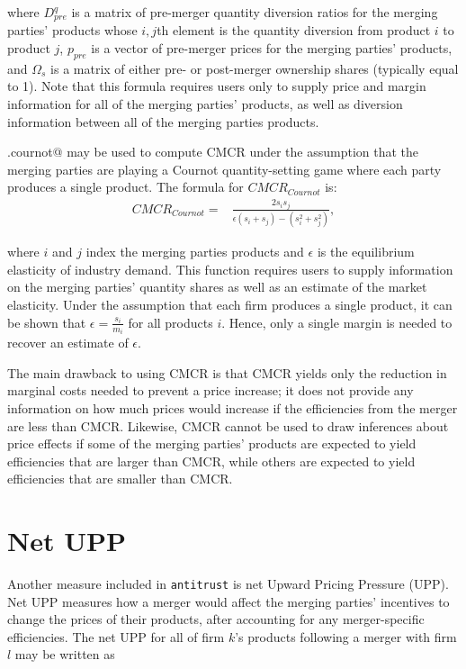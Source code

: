 \documentclass[11pt,numbers=noenddot,pointlessnumbers]{scrreprt}
\newcommand{\atr}{{\tt antitrust}}
\numberwithin{equation}{section}
\begin{document}
where $D^q_{pre}$ is a matrix of pre-merger quantity diversion ratios for the
merging parties' products whose
$i,j$th element is the quantity diversion from product $i$ to product
$j$, $p_{pre}$ is a vector of pre-merger prices for the merging
parties' products, and
$\Omega_s$ is a matrix of either pre- or
post-merger ownership shares (typically equal to 1). Note that this
formula requires users only to supply price and
margin information for all of the merging parties' products, as well
as diversion information between all of the merging parties products.

\verb@cmcr.cournot@ may be used to compute CMCR under the assumption
that the merging parties are playing a Cournot quantity-setting
game where each party produces a single product.  The formula for $CMCR_{Cournot}$ is:
\begin{align*}
  CMCR_{Cournot}=&\frac{2s_is_j}{\epsilon(s_i+s_j) - (s_i^2+s_j^2)},
\end{align*}

where $i$ and $j$ index the merging parties products and $\epsilon$ is
the equilibrium elasticity of industry demand.
This function requires users to supply information on the
merging parties' quantity shares as well as an estimate of the market
elasticity. Under the assumption that each firm produces a single
product, it can be shown that $\epsilon=\frac{s_i}{m_i}$ for all
products $i$. Hence, only a single margin is needed to recover an
estimate of $\epsilon$.

The main drawback to using CMCR is that CMCR yields only the
reduction in marginal costs needed to prevent a price increase; it does
not provide any information on how much prices would increase if the
efficiencies from the merger are less than CMCR.
Likewise, CMCR cannot be used to draw inferences about price
effects if some of the merging parties' products are
expected to yield efficiencies that are larger than CMCR,
while others are expected to yield
efficiencies that are smaller than CMCR.

\section{Net UPP}
Another measure included in \atr{} is net Upward Pricing Pressure
(UPP). Net UPP measures how a merger would affect the merging parties'
incentives to change the prices of their products, after
accounting for any merger-specific efficiencies.  The net UPP for all of firm $k$'s products following
a merger with firm $l$ may be written as
\end{document}
